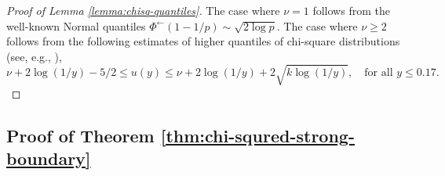 \begin{proof}[Proof of Lemma \ref{lemma:chisq-quantiles}]
The case where $\nu=1$ follows from the well-known Normal quantiles $\Phi^\leftarrow(1-1/p)\sim\sqrt{2\log{p}}$.
The case where $\nu\ge2$ follows from the following estimates of higher quantiles of chi-square distributions (see, e.g., \citep{inglot2010inequalities}),
\begin{equation}
    \nu +  2\log(1/y) -5/2 \le u(y) \le \nu +  2\log(1/y) + 2\sqrt{k\log(1/y)}, \quad \text{for all }y\le0.17.
\end{equation}
\end{proof}


\subsection{Proof of Theorem \ref{thm:chi-squred-strong-boundary}}

